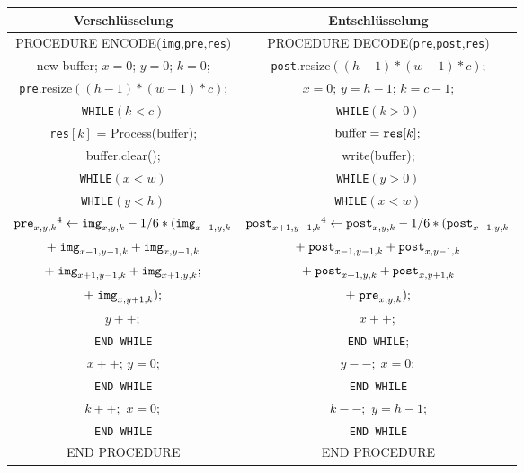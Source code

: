 \documentclass[a4paper,12pt]{article}
\begin{document}
\begin{tabular}{c|c}
Verschlüsselung & Entschlüsselung
\\
\hline
PROCEDURE ENCODE({\tt{img}},{\tt{pre}},{\tt{res}}) & PROCEDURE DECODE({\tt{pre}},{\tt{post}},{\tt{res}})
\\
new buffer; $x=0$; $y=0$; $k=0$; & {\tt{post}}.resize$((h-1)*(w-1)*c)$;
\\
{\tt{pre}}.resize$((h-1)*(w-1)*c)$; & $x=0$; $y=h-1$; $k=c-1$;
\\
{\tt{WHILE}}$(k < c)$ &                  {\tt{WHILE}}$(k > 0)$
\\
{\tt{res}}$[k]$ = Process(buffer); &  $\text{buffer} = \text{{\tt{res}}}[k];$
\\
buffer.clear(); & write(buffer); 
\\
{\tt{WHILE}}$(x < w)$ &   {\tt{WHILE}}$(y > 0)$          
\\
{\tt{WHILE}}$(y < h)$ &   {\tt{WHILE}}$(x<w)$     
\\
$\text{{\tt{pre}}}_{x,y,k}\footnotemark[4]\leftarrow \text{{\tt{img}}}_{x,y,k} - 1/6 *(\text{{\tt{img}}}_{x-1,y,k}$ &  $\text{{\tt{post}}}_{x+1,y-1,k}\footnotemark[4]\leftarrow \text{{\tt{post}}}_{x,y,k} - 1/6 *(\text{{\tt{post}}}_{x-1,y,k} $ 
\\
$+\;\text{{\tt{img}}}_{x-1,y-1,k} + \text{{\tt{img}}}_{x,y-1,k}$ & $+\;\text{{\tt{post}}}_{x-1,y-1,k} + \text{{\tt{post}}}_{x,y-1,k}$  
\\
$+\;\text{{\tt{img}}}_{x+1,y-1,k} + \text{{\tt{img}}}_{x+1,y,k};$ & $+\;\text{{\tt{post}}}_{x+1,y,k} + \text{{\tt{post}}}_{x,y+1,k}  $
\\
 $+\;\text{{\tt{img}}}_{x,y+1,k});$    &   $+\; \text{{\tt{pre}}}_{x,y,k});$
\\
 $y++;$  & $x++;$
\\
{\tt{END {\tt{WHILE}}}}   & {\tt{END {\tt{WHILE}}}};
\\
$x++$; $y=0$;    & $y--;\;x=0;$  
\\
{\tt{END {\tt{WHILE}}}}   & {\tt{END {\tt{WHILE}}}} 
\\
$k++;$ $x=0;$  &  $k--;$ $y=h-1$;
\\
{\tt{END {\tt{WHILE}}}}    &   {\tt{END {\tt{WHILE}}}} 
\\
END PROCEDURE & END PROCEDURE
\end{tabular}
\end{document}
